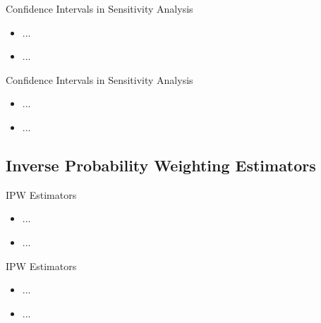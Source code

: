 \documentclass{beamer}
\begin{document}

\begin{frame}{Confidence Intervals in Sensitivity Analysis}

\begin{itemize}
  \itemsep12pt
  \item ...
  \item ...
\end{itemize}

\end{frame}


\begin{frame}{Confidence Intervals in Sensitivity Analysis}

\begin{itemize}
  \itemsep12pt
  \item ...
  \item ...
\end{itemize}

\end{frame}

\subsection{Inverse Probability Weighting Estimators}

\begin{frame}{IPW Estimators}

\begin{itemize}
  \itemsep12pt
  \item ...
  \item ...
\end{itemize}

\end{frame}

\begin{frame}{IPW Estimators}

\begin{itemize}
  \itemsep12pt
  \item ...
  \item ...
\end{itemize}

\end{frame}
\end{document}
